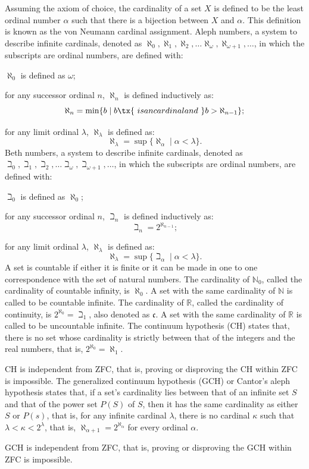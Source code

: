 \documentclass[a4paper,12pt]{article}
\begin{document}
Assuming the axiom of choice, the cardinality of a set $X$ is defined to be the least ordinal number $\alpha$ such that there is a bijection between $X$ and $\alpha$. This definition is known as the von Neumann cardinal assignment.
Aleph numbers, a system to describe infinite cardinals, denoted as $\aleph_0, \aleph_1, \aleph_2, \ldots \aleph_\omega, \aleph_{\omega+1}, \ldots$, in which the subscripts are ordinal numbers, are defined with:
\bit
\item $\aleph_0$ is defined as $\omega$;
\item for any successor ordinal $n$, $\aleph_n$ is defined inductively as:
\[\aleph_n=\min\{b\mid b\tx{\ is an cardinal and\ }b>\aleph_{n-1}\};\]
\item for any limit ordinal $\lambda$, $\aleph_{\lambda}$ is defined as:
\[\aleph_{\lambda}=\sup\{\aleph_{\alpha}\mid\alpha<\lambda\}.\]
\eit
{}
Beth numbers, a system to describe infinite cardinals, denoted as $\beth_0, \beth_1, \beth_2, \ldots \beth_\omega, \beth_{\omega+1}, \ldots$, in which the subscripts are ordinal numbers, are defined with:
\bit
\item $\beth_0$ is defined as $\aleph_0$;
\item for any successor ordinal $n$, $\beth_n$ is defined inductively as:
\[\beth_n=2^{\aleph_{n-1}};\]
\item for any limit ordinal $\lambda$, $\aleph_{\lambda}$ is defined as:
\[\aleph_{\lambda}=\sup\{\beth_{\alpha}\mid\alpha<\lambda\}.\]
\eit
{}
A set is countable if either it is finite or it can be made in one to one correspondence with the set of natural numbers.
The cardinality of $\mathbb{N}_0$, called the cardinality of countable infinity, is $\aleph_0$. A set with the same cardinality of $\mathbb{N}$ is called to be countable infinite.
The cardinality of $\mathbb{R}$, called the cardinality of continuity, is $2^{\aleph_0}=\beth_1$, also denoted as $\mathfrak{c}$. A set with the same cardinality of $\mathbb{R}$ is called to be uncountable infinite.
The continuum hypothesis (CH) states that, there is no set whose cardinality is strictly between that of the integers and the real numbers, that is, $2^{\aleph_0}=\aleph_1$.

CH is independent from ZFC, that is, proving or disproving the CH within ZFC is impossible.
The generalized continuum hypothesis (GCH) or Cantor's aleph hypothesis states that, if a set's cardinality lies between that of an infinite set $S$ and that of the power set $P(S)$ of $S$, then it has the same cardinality as either $S$ or $P(s)$, that is, for any infinite cardinal $\lambda$, there is no cardinal $\kappa$ such that $\lambda <\kappa <2^{\lambda }$, that is, $\aleph _{\alpha +1}=2^{\aleph _{\alpha }}$ for every ordinal $\alpha$.

GCH is independent from ZFC, that is, proving or disproving the GCH within ZFC is impossible.
\end{document}
